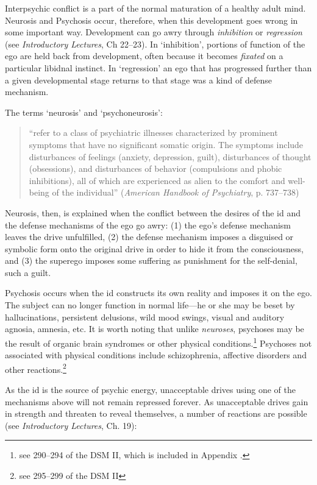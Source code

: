 \begin{refsection}
Interpsychic conflict is a part of the normal maturation of a healthy adult mind. Neurosis and Psychosis occur, therefore, when this development goes wrong in some important way. Development can go awry through \emph{inhibition} or \emph{regression} (see \emph{Introductory Lectures}, Ch 22--23). In `inhibition', portions of function of the ego are held back from development, often because it becomes \emph{fixated} on a particular libidnal instinct. In `regression' an ego that has progressed further than a given developmental stage returns to that stage was a kind of defense mechanism.

The terms `neurosis' and `psychoneurosis':

\begin{quote}

``refer to a class of psychiatric illnesses characterized by prominent symptoms that have no significant somatic origin. The symptoms include disturbances of feelings (anxiety, depression, guilt), disturbances of thought (obsessions), and disturbances of behavior (compulsions and phobic inhibitions), all of which are experienced as alien to the comfort and well-being of the individual'' (\emph{American Handbook of Psychiatry}, p. 737--738)
\end{quote}

Neurosis, then, is explained when the conflict between the desires of the id and the defense mechanisms of the ego go awry: (1) the ego's defense mechanism leaves the drive unfulfilled, (2) the defense mechanism imposes a disguised or symbolic form onto the original drive in order to hide it from the consciousness, and (3) the superego imposes some suffering as punishment for the self-denial, such a guilt.

Psychosis occurs when the id constructs its own reality and imposes it on the ego. The subject can no longer function in normal life---he or she may be beset by hallucinations, persistent delusions, wild mood swings, visual and auditory agnosia, amnesia, etc. It is worth noting that unlike \emph{neuroses}, psychoses may be the result of organic brain syndromes or other physical conditions.\footnote{see 290--294 of the DSM II, which is included in Appendix .} Psychoses not associated with physical conditions include schizophrenia, affective disorders and other reactions.\footnote{see 295--299 of the DSM II}

As the id is the source of psychic energy, unacceptable drives using one of the mechanisms above will not remain repressed forever. As unacceptable drives gain in strength and threaten to reveal themselves, a number of reactions are possible (see \emph{Introductory Lectures}, Ch. 19):


\end{refsection}
